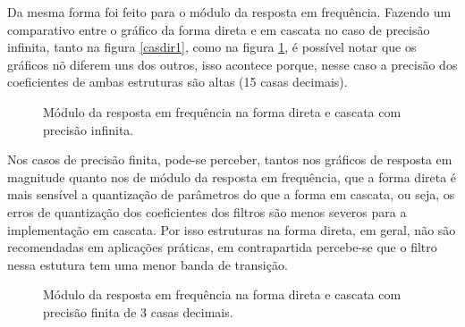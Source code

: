 \documentclass[12pt]{article}
\begin{document}
Da mesma forma foi feito para o m\'odulo da resposta em frequ\^encia. Fazendo um comparativo entre o gráfico da forma direta e em cascata no caso de precis\~ao infinita, tanto na figura \ref{casdir1}, como na figura \ref{precisao_infinita}, \'e poss\'ivel notar que os gr\'aficos n\~o diferem uns dos outros, isso acontece porque, nesse caso a precis\~ao dos coeficientes de ambas estruturas s\~ao altas (15 casas decimais).

\begin{figure}[H]
\caption{Módulo da resposta em frequ\^encia na forma direta e cascata com precis\~ao infinita.}
\label{precisao_infinita}
\end{figure}

Nos casos de precis\~ao finita, pode-se perceber, tantos nos gr\'aficos de resposta em magnitude quanto nos de m\'odulo da resposta em frequ\^encia, que a forma direta \' e mais sens\' ivel a quantiza\c c\~ao de par\^ametros do que a forma em cascata, ou seja, os erros de quantiza\c c\~ao dos coeficientes dos filtros s\~ao menos severos para a implementa\c c\~ao em cascata. Por isso estruturas na forma direta, em geral, n\~ao s\~ao  recomendadas em aplica\c c\~oes pr\'aticas, em contrapartida percebe-se que o filtro nessa estutura tem uma menor banda de transi\c c\~ao.

\begin{figure}[H]
\caption{Módulo da resposta em frequ\^encia na forma direta e cascata com precis\~ao finita de 3 casas decimais.}
\label{precisao_finita3}
\end{figure}
\end{document}
